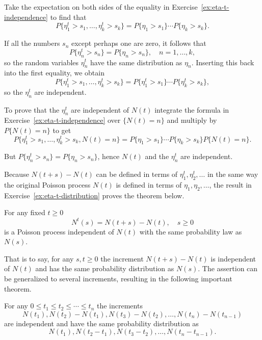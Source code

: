 \begin{Solution}
Take the expectation on both sides of the equality in Exercise~\ref{ex:eta-t-independence} to find that
\begin{equation}
P\{\eta_1^t > s_1, \ldots, \eta_k^t > s_k\} = P\{\eta_1 > s_1\} \cdots P\{\eta_k > s_k\}.
\end{equation}

If all the numbers $s_n$ except perhaps one are zero, it follows that
\[
P\{\eta_n^t > s_n\} = P\{\eta_n > s_n\}, \quad n = 1, \ldots, k,
\]
so the random variables $\eta_n^t$ have the same distribution as $\eta_n$. Inserting this back into the first equality, we obtain
\[
P\{\eta_1^t > s_1, \ldots, \eta_k^t > s_k\} = P\{\eta_1^t > s_1\} \cdots P\{\eta_k^t > s_k\},
\]
so the $\eta_n^t$ are independent.

To prove that the $\eta_n^t$ are independent of $N(t)$ integrate the formula in Exercise~\ref{ex:eta-t-independence} over $\{N(t) = n\}$ and multiply by $P\{N(t) = n\}$ to get
\[
P\{\eta_1^t > s_1, \ldots, \eta_k^t > s_k, N(t) = n\} = P\{\eta_1 > s_1\} \cdots P\{\eta_k > s_k\} P\{N(t) = n\}.
\]

But $P\{\eta_n^t > s_n\} = P\{\eta_n > s_n\}$, hence $N(t)$ and the $\eta_n^t$ are independent.
\end{Solution}

Because $N(t + s) - N(t)$ can be defined in terms of $\eta_1^t, \eta_2^t, \ldots$ in the same way the original Poisson process $N(t)$ is defined in terms of $\eta_1, \eta_2, \ldots$, the result in Exercise~\ref{ex:eta-t-distribution} proves the theorem below.

\begin{Theorem}
\label{thm:poisson-stationarity}
For any fixed $t \geq 0$
\[
N^t(s) = N(t + s) - N(t), \quad s \geq 0
\]
is a Poisson process independent of $N(t)$ with the same probability law as $N(s)$.
\end{Theorem}

That is to say, for any $s, t \geq 0$ the increment $N(t + s) - N(t)$ is independent of $N(t)$ and has the same probability distribution as $N(s)$. The assertion can be generalized to several increments, resulting in the following important theorem.

\begin{Theorem}
\label{thm:poisson-independent-increments}
For any $0 \leq t_1 \leq t_2 \leq \cdots \leq t_n$ the increments
\[
N(t_1), N(t_2) - N(t_1), N(t_3) - N(t_2), \ldots, N(t_n) - N(t_{n-1})
\]
are independent and have the same probability distribution as
\[
N(t_1), N(t_2 - t_1), N(t_3 - t_2), \ldots, N(t_n - t_{n-1}).
\]
\end{Theorem}

